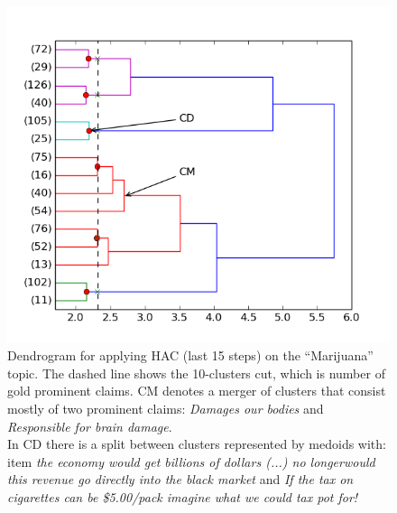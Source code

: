 \begin{figure}[h]
\begin{center}
\includegraphics{dendrogram.png}
\end{center}
\caption{Dendrogram for applying HAC (last 15 steps) on the ``Marijuana'' topic.
The dashed line shows the 10-clusters cut, which is number of gold prominent
claims.
CM denotes a merger of clusters that consist mostly of two prominent claims: 
\textit{Damages our bodies} and \textit{Responsible for brain damage}.  \\
In CD there is a split between clusters represented by medoids with: 
item \textit{the economy would get billions of dollars (...) no longerwould this revenue
go directly into the black market} and 
\textit{If the tax on cigarettes can
be \$5.00/pack imagine what we could tax pot for!}
}
\label{fig:dendrogram}
\end{figure}

